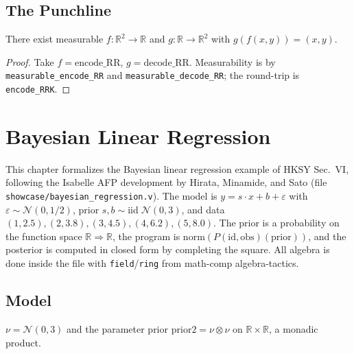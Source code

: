\section{The Punchline}\label{sec:punchline}

\begin{theorem}\label{thm:pair_standard_borel}
  \rocqok
  There exist measurable $f : \mathbb{R}^2 \to \mathbb{R}$
  and $g : \mathbb{R} \to \mathbb{R}^2$ with $g(f(x,y)) = (x,y)$.
\end{theorem}
\begin{proof}
  \rocqok
  Take $f = \mathrm{encode\_RR}$, $g = \mathrm{decode\_RR}$.
  Measurability is by \texttt{measurable\_encode\_RR} and
  \texttt{measurable\_decode\_RR}; the round-trip is
  \texttt{encode\_RRK}.
\end{proof}


\chapter{Bayesian Linear Regression}\label{ch:bayesian}

This chapter formalizes the Bayesian linear regression example of HKSY
Sec.~VI, following the Isabelle AFP development by Hirata, Minamide, and
Sato (file \texttt{showcase/bayesian\_regression.v}).
The model is $y = s \cdot x + b + \varepsilon$ with
$\varepsilon \sim \mathcal{N}(0, 1/2)$,
prior $s, b \sim \mathrm{iid}\; \mathcal{N}(0, 3)$,
and data $(1,2.5), (2,3.8), (3,4.5), (4,6.2), (5,8.0)$.
The prior is a probability on the function space $\mathbb{R} \Rightarrow
\mathbb{R}$, the program is $\mathrm{norm}(P(\mathrm{id}, \mathrm{obs})
(\mathrm{prior}))$, and the posterior is computed in closed form
by completing the square.
All algebra is done inside the file with \texttt{field}/\texttt{ring} from
math-comp algebra-tactics.

\section{Model}\label{sec:priors}

\begin{definition}\label{def:prior2}
  \rocqok
  $\nu = \mathcal{N}(0, 3)$ and the parameter prior
  $\mathrm{prior2} = \nu \otimes \nu$ on $\mathbb{R} \times \mathbb{R}$,
  a monadic product.
\end{definition}

